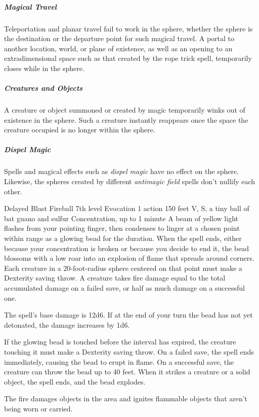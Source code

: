 \documentclass[10pt,a4paper,twoside,bg=print,twocolumn,openany,nodeprecatedcode]{dndbook}
\begin{document}
\subparagraph{Magical Travel}
Teleportation and planar travel fail to work in the sphere, whether the sphere is the destination or the departure point for such magical travel. A portal to another location, world, or plane of existence, as well as an opening to an extradimensional space such as that created by the rope trick spell, temporarily closes while in the sphere.

\subparagraph{Creatures and Objects}
A creature or object summoned or created by magic temporarily winks out of existence in the sphere. Such a creature instantly reappears once the space the creature occupied is no longer within the sphere.

\subparagraph{Dispel Magic}
Spells and magical effects such as \textit{dispel magic} have no effect on the sphere. Likewise, the spheres created by different \textit{antimagic field} spells don't nullify each other.



\DndSpellHeader%
{Delayed Blast Fireball}
{7th level Evocation}
{1 action}
{150 feet}
{V, S, a tiny ball of bat guano and sulfur}
{Concentration, up to 1 minute}
A beam of yellow light flashes from your pointing finger, then condenses to linger at a chosen point within range as a glowing bead for the duration. When the spell ends, either because your concentration is broken or because you decide to end it, the bead blossoms with a low roar into an explosion of flame that spreads around corners. Each creature in a 20-foot-radius sphere centered on that point must make a Dexterity saving throw. A creature takes fire damage equal to the total accumulated damage on a failed save, or half as much damage on a successful one.

The spell's base damage is 12d6. If at the end of your turn the bead has not yet detonated, the damage increases by 1d6.

If the glowing bead is touched before the interval has expired, the creature touching it must make a Dexterity saving throw. On a failed save, the spell ends immediately, causing the bead to erupt in flame. On a successful save, the creature can throw the bead up to 40 feet. When it strikes a creature or a solid object, the spell ends, and the bead explodes.

The fire damages objects in the area and ignites flammable objects that aren't being worn or carried.

\end{document}
